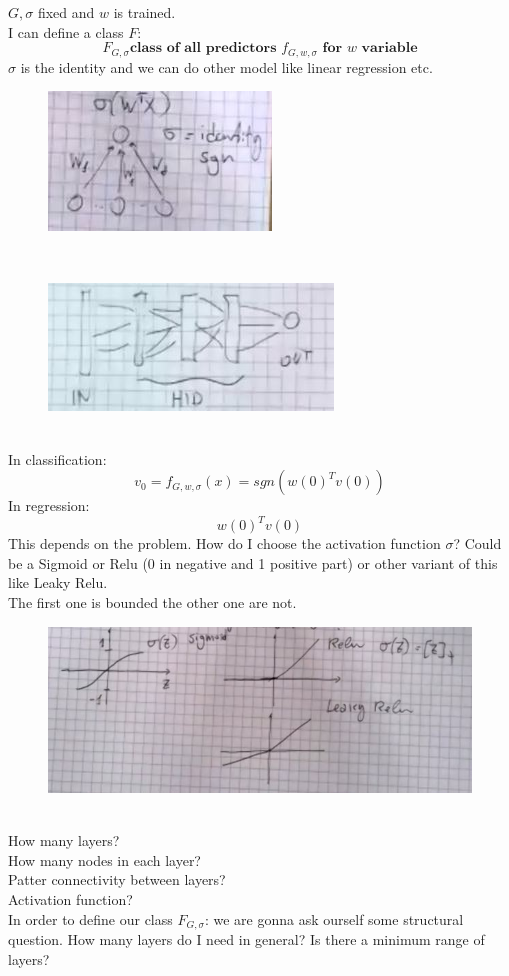 \documentclass[../main.tex]{subfiles}
\begin{document}
$G, \sigma$ fixed and $w$ is trained.
\\
I can define a class $F$:
$$
F_{G,\sigma} \textbf{class of all predictors $f_{G,w,\sigma}$ for $w$ variable}
$$
$\sigma$ is the identity and we can do other model like linear regression etc.
\begin{figure}[h]
    \centering
    \includegraphics[width=0.3\linewidth]{../img/lez24-img8.JPG}
    \caption{}
\end{figure}\\
\newpage
{}
\begin{figure}[h]
    \centering
    \includegraphics[width=0.3\linewidth]{../img/lez24-img9.JPG}
    \caption{}
\end{figure}\\
In classification:
$$
v_0 = f_{G,w,\sigma}(x) = sgn (w(0)^T v(0))
$$
In regression:
$$
w(0)^T v(0)
$$
This depends on the problem. How do I choose the activation function $\sigma$?
Could be a Sigmoid or Relu (0 in negative and 1 positive part) or other variant of this like Leaky Relu. \\
The first one is bounded the other one are not.
\begin{figure}[h]
    \centering
    \includegraphics[width=0.5\linewidth]{../img/lez24-img10.JPG}
    \caption{}
\end{figure}\\
How many layers? 
\\ How many nodes in each layer?
\\ Patter connectivity between layers?
\\ Activation function?
\\
In order to define our class $F_{G,\sigma}$:
we are gonna ask ourself some structural question. How many layers do I need in general? Is there a minimum range of layers?
\newpage
\end{document}
